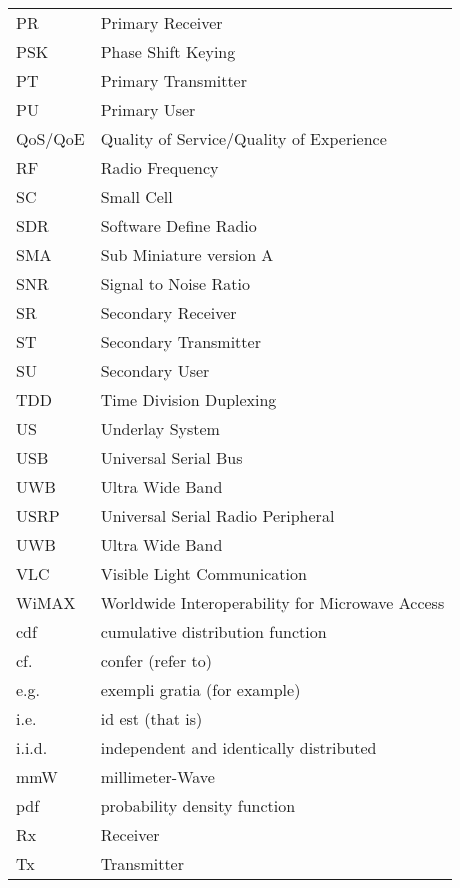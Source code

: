 \begin{longtable}{p{}p{}}
	PR	& 	Primary Receiver \\
	PSK	& 	Phase Shift Keying \\
	PT	& 	Primary Transmitter \\
	PU	& 	Primary User \\
	QoS/QoE & 	Quality of Service/Quality of Experience \\
	RF	&	Radio Frequency \\
	SC 	&	Small Cell \\
	SDR 	&	Software Define Radio \\
	SMA 	&	Sub Miniature version A\\
	SNR	&	Signal to Noise Ratio \\
	SR	& 	Secondary Receiver \\
	ST	& 	Secondary Transmitter \\
	SU	&	Secondary User \\
	TDD	& 	Time Division Duplexing \\
	US	&	Underlay System \\
	USB	&	Universal Serial Bus \\
	UWB 	&	Ultra Wide Band \\
	USRP	&	Universal Serial Radio Peripheral\\
	UWB 	&	Ultra Wide Band \\
	VLC 	&	Visible Light Communication\\
	WiMAX   &       Worldwide Interoperability for Microwave Access \\

	cdf	&       cumulative distribution function \\
	cf.	&	confer (refer to) \\ 
 	e.g.	& 	exempli gratia (for example) \\
 	i.e.	& 	id est (that is) \\ 
 	i.i.d.	& 	independent and identically distributed \\ 
	mmW 	&       millimeter-Wave\\
	pdf	&       probability density function \\
 	Rx	& 	Receiver \\
 	Tx	& 	Transmitter

\end{longtable}
  


